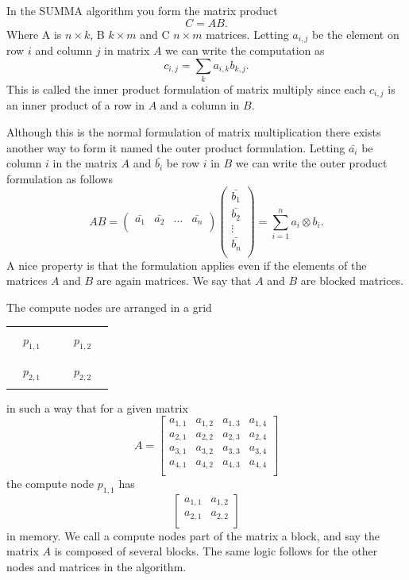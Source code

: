 \documentclass{article}
\begin{document}
In the SUMMA algorithm you form the matrix product
\[
C = AB.
\]
Where A is $n \times k$, B $k \times m$ and C $n \times m$ matrices.
Letting $a_{i,j}$ be the element on row $i$ and column $j$ in matrix $A$
we can write the computation as
\[
c_{i,j} = \sum_k a_{i,k} b_{k,j}.
\]
This is called the inner product formulation of matrix multiply since each $c_{i,j}$ is
an inner product of a row in $A$ and a column in $B$.

Although this is the normal formulation of matrix multiplication there exists another way to
form it named the outer product formulation.
Letting $\bar{a_i}$ be column $i$ in the matrix $A$ and $\bar{b_i}$ be row $i$ in $B$ we can write
the outer product formulation as follows
\[
AB = \begin{pmatrix}
	\bar{a_1} & \bar{a_2} & \dots & \bar{a_n}\\
     \end{pmatrix}
     \begin{pmatrix}
	\bar{b_1}\\
	\bar{b_2}\\
	\vdots\\
	\bar{b_n}\\
     \end{pmatrix}
     =\sum_{i=1}^n a_i \otimes b_i.
\]
A nice property is that the formulation applies even if the
elements of the matrices $A$ and $B$ are again matrices. We say that $A$ and $B$ are blocked
matrices.

The compute nodes are arranged in a grid
\begin{center}
\begin{tabular}{| c c c | c c c |}
\hline
&&&&&\\
&$p_{1,1}$ &&& $p_{1,2}$&\\
&&&&&\\
\hline
&&&&&\\
&$p_{2,1}$ &&& $p_{2,2}$&\\
&&&&&\\
\hline
\end{tabular}
\end{center}

in such a way that for a given matrix
\[
A=\begin{bmatrix}
a_{1,1} & a_{1,2} & a_{1,3} & a_{1,4} \\
a_{2,1} & a_{2,2} & a_{2,3} & a_{2,4} \\
a_{3,1} & a_{3,2} & a_{3,3} & a_{3,4} \\
a_{4,1} & a_{4,2} & a_{4,3} & a_{4,4} \\
\end{bmatrix}
\]
the compute node $p_{1,1}$ has
\[
\begin{bmatrix}
a_{1,1} & a_{1,2} \\
a_{2,1} & a_{2,2} \\
\end{bmatrix}
\]
in memory. We call a compute nodes part of the matrix a block, and say the matrix $A$ is composed of several blocks. The same logic follows for the other nodes and matrices in the algorithm.
\end{document}

